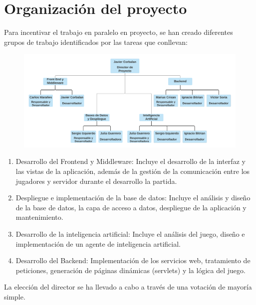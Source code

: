 \section{Organización del proyecto}
\label{organiz}

Para incentivar el trabajo en paralelo en proyecto, se han creado diferentes grupos de trabajo identificados por las tareas que conllevan:

\begin{figure}[h]
	\centering \includegraphics[scale=0.6]{figuras/organigrama2.png}
\end{figure}

\begin{enumerate}
\item Desarrollo del Frontend y Middleware: Incluye el desarrollo de la interfaz y las vistas de la aplicación, además de la gestión de la comunicación entre los jugadores y servidor durante el desarrollo la partida.
\item Despliegue e implementación de la base de datos: Incluye el análisis y diseño de la base de datos, la capa de acceso a datos, despliegue de la aplicación y mantenimiento.
\item Desarrollo de la inteligencia artificial: Incluye el análisis del juego, diseño e implementación de un agente de inteligencia artificial.
\item Desarrollo del Backend: Implementación de los servicios web, tratamiento de peticiones, generación de páginas dinámicas (servlets) y la lógica del juego.
\end{enumerate}

La elección del director se ha llevado a cabo a través de una votación de mayoría simple.
